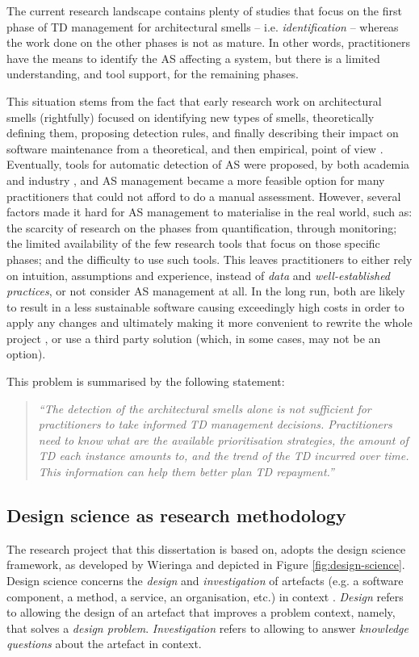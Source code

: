 The current research landscape contains plenty of studies that focus on the first phase of TD management for architectural smells -- i.e.  \emph{identification} -- whereas the work done on the other phases is not as mature.
In other words, practitioners have the means to identify the AS affecting a system, but there is a limited understanding, and tool support, for the remaining phases.

This situation stems from the fact that early research work on architectural smells (rightfully) focused on identifying new types of smells, theoretically defining them, proposing detection rules, and finally describing their impact on software maintenance from a theoretical, and then empirical, point of view \cite{Lippert2006,Garcia2009,Mo2015,Le2016,Arcelli2016}.
Eventually, tools for automatic detection of AS were proposed, by both academia and industry \cite{Avgeriou2021,Khomyakov2020}, and AS management became a more feasible option for many practitioners that could not afford to do a manual assessment.
However, several factors made it hard for AS management to materialise in the real world, such as: the scarcity of research on the phases from quantification, through monitoring; the limited availability of the few research tools that focus on those specific phases; and the difficulty to use such tools.
This leaves practitioners to either rely on intuition, assumptions and experience, instead of \emph{data} and \emph{well-established practices}, or not consider AS management at all.
In the long run, both are likely to result in a less sustainable software \cite{Winters2020} causing exceedingly high costs in order to apply any changes and ultimately making it more convenient to rewrite the whole project \cite{Lehman1979}, or use a third party solution (which, in some cases, may not be an option).

This problem is summarised by the following statement:
\begin{quote}\itshape
    ``The detection of the architectural smells alone is not sufficient for practitioners to take informed TD management decisions.
    Practitioners need to know what are the available prioritisation strategies, the amount of TD each instance amounts to, and the trend of the TD incurred over time. This information can help them better plan TD repayment.''
\end{quote}

\subsection{Design science as research methodology}
The research project that this dissertation is based on, adopts the design science framework, as developed by Wieringa \cite{Wieringa2014} and depicted in Figure \ref{fig:design-science}.
Design science concerns the \emph{design} and \emph{investigation} of artefacts (e.g. a software component, a method, a service, an organisation, etc.) in context \cite{Wieringa2014}.
\emph{Design} refers to allowing the design of an artefact that improves a problem context, namely, that solves a \emph{design problem}. 
\emph{Investigation} refers to allowing to answer \emph{knowledge questions} about the artefact in context.

